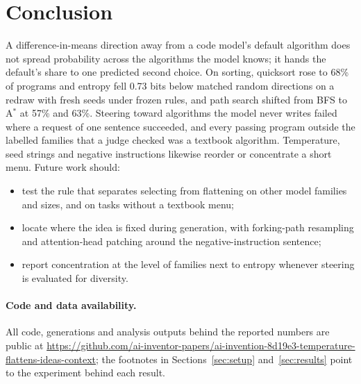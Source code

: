 \documentclass[11pt,letterpaper]{article}
\newcommand{\Astar}{A$^{*}$}
\begin{document}
\section{Conclusion}
\label{sec:conclusion}

A difference-in-means direction away from a code model's default algorithm does not spread probability across the algorithms the model knows; it hands the default's share to one predicted second choice. On sorting, quicksort rose to 68\% of programs and entropy fell 0.73 bits below matched random directions on a redraw with fresh seeds under frozen rules, and path search shifted from BFS to \Astar{} at 57\% and 63\%. Steering toward algorithms the model never writes failed where a request of one sentence succeeded, and every passing program outside the labelled families that a judge checked was a textbook algorithm. Temperature, seed strings and negative instructions likewise reorder or concentrate a short menu. Future work should:
\begin{itemize}
  \item test the rule that separates selecting from flattening on other model families and sizes, and on tasks without a textbook menu;
  \item locate where the idea is fixed during generation, with forking-path resampling and attention-head patching around the negative-instruction sentence;
  \item report concentration at the level of families next to entropy whenever steering is evaluated for diversity.
\end{itemize}

\paragraph{Code and data availability.} All code, generations and analysis outputs behind the reported numbers are public at \url{https://github.com/ai-inventor-papers/ai-invention-8d19e3-temperature-flattens-ideas-context}; the footnotes in Sections~\ref{sec:setup} and~\ref{sec:results} point to the experiment behind each result.



\end{document}
